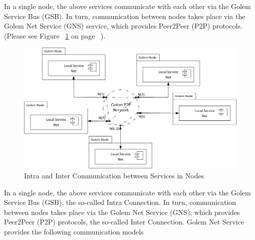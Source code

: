 In a single node, the above services communicate with each other via the Golem Service Bus (GSB).
In turn, communication between nodes takes place via the Golem Net Service (GNS) service, which provides Peer2Peer (P2P) protocols.
(Please see Figure ~\ref{fig:CCR} on page ~\pageref{fig:CCR}).

\begin{figure}[H]
    \centering
    \includegraphics[width=14cm,angle=0]{./diag/Reference/CommunicationConcept-Reference.png}
	\caption{Intra and Inter Communication between Services in Nodes}
    \label{fig:CCR}
\end{figure}


In a single node, the above services communicate with each other via the Golem Service Bus (GSB), the so-called Intra Connection.
In turn, communication between nodes takes place via the Golem Net Service (GNS), which provides Peer2Peer (P2P) protocols, the so-called Inter Connection.
Golem Net Service provides the following communication models

